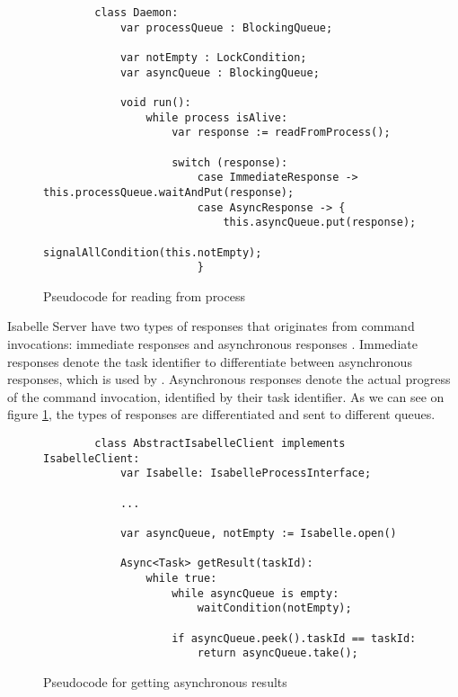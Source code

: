 \begin{figure}[h]
    \begin{lstlisting}
        class Daemon:
            var processQueue : BlockingQueue;
            
            var notEmpty : LockCondition;
            var asyncQueue : BlockingQueue;
            
            void run():
                while process isAlive:
                    var response := readFromProcess();

                    switch (response):
                        case ImmediateResponse -> this.processQueue.waitAndPut(response);
                        case AsyncResponse -> {
                            this.asyncQueue.put(response);
                            signalAllCondition(this.notEmpty);
                        }
    \end{lstlisting}

    \caption{Pseudocode for reading from process}
    \label{fig:IsabelleDaemon}
\end{figure}

Isabelle Server have two types of responses that originates from command invocations: immediate responses and asynchronous responses 
\cite[Sec 4.2.6]{isabelleSystem}. Immediate responses denote the task identifier to differentiate between asynchronous responses, 
which is used by . Asynchronous responses denote the actual progress of the command invocation, 
identified by their task identifier. As we can see on figure \ref{fig:IsabelleDaemon}, the types of responses are differentiated and sent 
to different queues.

\begin{figure}[h]
    \begin{lstlisting}
        class AbstractIsabelleClient implements IsabelleClient:
            var Isabelle: IsabelleProcessInterface;
            
            ...

            var asyncQueue, notEmpty := Isabelle.open()

            Async<Task> getResult(taskId):
                while true:
                    while asyncQueue is empty:
                        waitCondition(notEmpty);
                
                    if asyncQueue.peek().taskId == taskId:
                        return asyncQueue.take();
    \end{lstlisting}

    \caption{Pseudocode for getting asynchronous results}
    \label{fig:getResult}
\end{figure}

